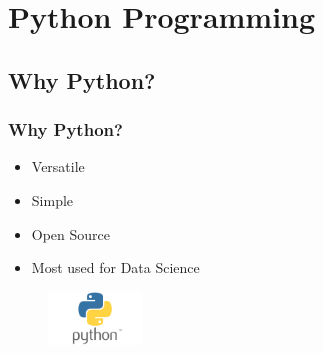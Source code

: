 

\newlength\myheight
\newlength\mydepth
\settototalheight{}
\settodepth{}
\setlength\fboxsep{0pt}
\newcommand*\inlinegraphics[1]{%
  \settototalheight\myheight{Xygp}%
  \settodepth\mydepth{Xygp}%
  \raisebox{-\mydepth}{\texttt{[image: \#1]}}%
}



\begin{frame}
   \titlepage
\end{frame}



\begin{frame}
   \tableofcontents
\end{frame}

\section{Python Programming}


\subsection{Why Python?}

\begin{frame}\frametitle{Why Python?}
   \begin{itemize}
      \item Versatile
      \item Simple
      \item Open Source
      \item Most used for Data Science
   \end{itemize}

   \vspace{1cm}
   \begin{minipage}{0.4\linewidth}
      \begin{figure}[H]
         \includegraphics[width=2.5cm]{../images/illustrations/python_logo.png}
      \end{figure}
   \end{minipage}

\end{frame}


